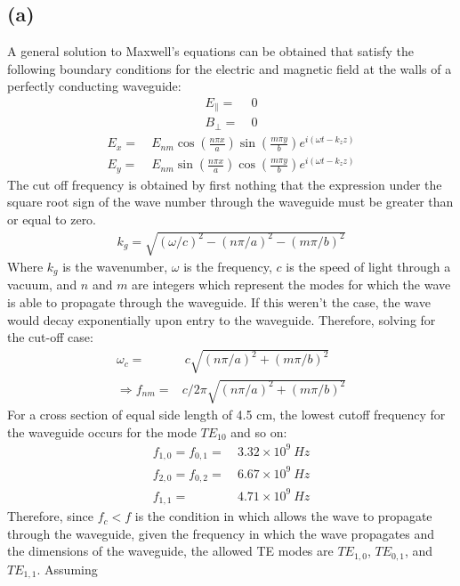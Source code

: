 \documentclass[8pt,a4paper,oneside]{article}
\begin{document}
\subsection*{(a)}
A general solution to Maxwell's equations can be obtained that satisfy the following boundary conditions for the electric and magnetic field at the walls of a perfectly conducting waveguide:
\begin{align}
	E_\parallel =&~ 0 \\
	B_\perp =&~ 0
\end{align}
\begin{align}
	E_x =&~ E_{nm}\cos\left({\frac{n\pi x}{a}}\right)\sin\left({\frac{m\pi y}{b}}\right) e^{i(\omega t - k_zz)}\\
	E_y =&~ E_{nm}\sin\left({\frac{n\pi x}{a}}\right)\cos\left({\frac{m\pi y}{b}}\right) e^{i(\omega t - k_zz)}
\end{align}
The cut off frequency is obtained by first nothing that the expression under the square root sign of the wave number through the waveguide must be greater than or equal to zero.
\begin{align}
	k_g = \sqrt{(\omega/c)^2 - (n\pi/a)^2 - (m\pi/b)^2}
\end{align}
Where $k_g$ is the wavenumber, $\omega$ is the frequency, $c$ is the speed of light through a vacuum, and $n$ and $m$ are integers which represent the modes for which the wave is able to propagate through the waveguide. If this weren't the case, the wave would decay exponentially upon entry to the waveguide. Therefore, solving for the cut-off case:
\begin{align}
	\omega_c =&~ c\sqrt{(n\pi/a)^2 + (m\pi/b)^2}\\
	\Rightarrow f_{nm} =& c/2\pi \sqrt{(n\pi/a)^2 + (m\pi/b)^2}
\end{align}
For a cross section of equal side length of 4.5 cm, the lowest cutoff frequency for the waveguide occurs for the mode $TE_{10}$ and so on:
\begin{align}
	f_{1,0} = f_{0,1} =~& 3.32\times 10^{9} ~Hz\\
	f_{2,0} = f_{0,2} =~& 6.67\times 10^{9} ~Hz\\
	f_{1,1} =~&4.71 \times 10^{9} ~Hz
\end{align}
Therefore, since $f_c < f$ is the condition in which allows the wave to propagate through the waveguide, given the frequency in which the wave propagates and the dimensions of the waveguide, the allowed TE modes are $TE_{1,0}$, $TE_{0,1}$, and $TE_{1,1}$. Assuming 
\end{document}
